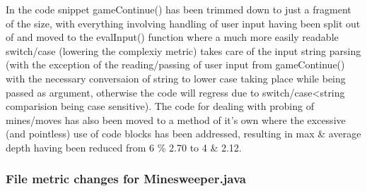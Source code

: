 \documentclass[UKenglish]{article}  %
\begin{document}

In the code snippet gameContinue() has been trimmed down to just a
fragment of the size, with everything involving handling of user input
having been split out of and moved to the evalInput() function where a
much more easily readable switch/case (lowering the complexiy metric) takes
care of the input string parsing (with the exception of the reading/passing
of user input from gameContinue() with the necessary conversaion of string
to lower case taking place while being passed as argument, otherwise the
code will regress due to switch/case<string comparision being case sensitive).
The code for dealing with probing of mines/moves has also been moved to a method
of it's own where the excessive (and pointless) use of code blocks has been
addressed, resulting in max \& average depth having been reduced from 6 \% 2.70
to 4 \& 2.12.

\subsubsection{File metric changes for Minesweeper.java}
\end{document}
